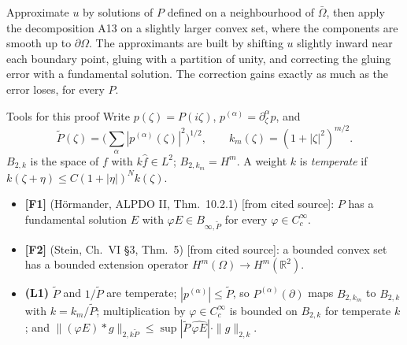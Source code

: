 \documentclass[11pt,a4paper,oneside]{report}
\newcommand{\badge}[2]{\textcolor{#1}{\textsf{\footnotesize[#2]}}}
\newcommand{\cf}{\badge{cD}{from cited source}}
\newcommand{\R}{\mathbb{R}}\newcommand{\C}{\mathbb{C}}\newcommand{\N}{\mathbb{N}}\newcommand{\Z}{\mathbb{Z}}\newcommand{\Q}{\mathbb{Q}}
\begin{document}
\begin{proofidea}
Approximate $u$ by solutions of $P$ defined on a neighbourhood of $\bar\Omega$, then apply the decomposition A13 on a slightly larger convex set, where the components are smooth up to $\partial\Omega$. The approximants are built by shifting $u$ slightly inward near each boundary point, gluing with a partition of unity, and correcting the gluing error with a fundamental solution. The correction gains exactly as much as the error loses, for every $P$.
\end{proofidea}

\begin{notebox}{Tools for this proof}
Write $p(\zeta)=P(i\zeta)$, $p^{(\alpha)}=\partial_\zeta^\alpha p$, and
\[
\tilde P(\zeta)=\Big(\sum_\alpha|p^{(\alpha)}(\zeta)|^2\Big)^{1/2},\qquad k_m(\zeta)=(1+|\zeta|^2)^{m/2}.
\]
$B_{2,k}$ is the space of $f$ with $k\hat f\in L^2$; $B_{2,k_m}=H^m$. A weight $k$ is \emph{temperate} if $k(\zeta+\eta)\le C(1+|\eta|)^Nk(\zeta)$.
\begin{itemize}
\item \textbf{[F1]} (H\"ormander, ALPDO II, Thm.~10.2.1) \cf: $P$ has a fundamental solution $E$ with $\varphi E\in B_{\infty,\tilde P}$ for every $\varphi\in C_c^\infty$.
\item \textbf{[F2]} (Stein, Ch.~VI \S3, Thm.~5) \cf: a bounded convex set has a bounded extension operator $H^m(\Omega)\to H^m(\R^2)$.
\item \textbf{(L1)} $\tilde P$ and $1/\tilde P$ are temperate; $|p^{(\alpha)}|\le\tilde P$, so $P^{(\alpha)}(\partial)$ maps $B_{2,k_m}$ to $B_{2,k}$ with $k=k_m/\tilde P$; multiplication by $\varphi\in C_c^\infty$ is bounded on $B_{2,k}$ for temperate $k$; and $\|(\varphi E)*g\|_{2,k\tilde P}\le\sup|\tilde P\,\widehat{\varphi E}|\cdot\|g\|_{2,k}$.
\end{itemize}
\end{notebox}
\end{document}
